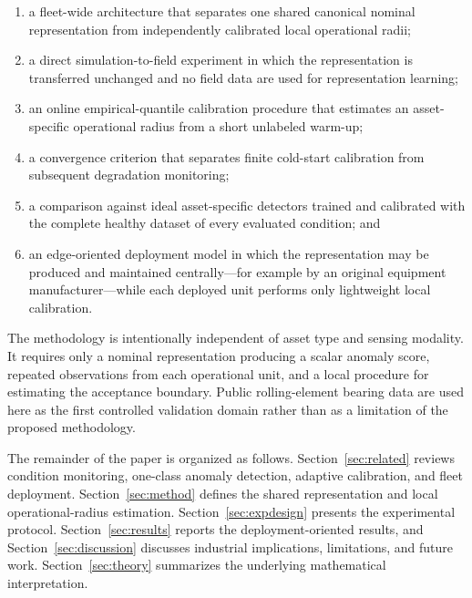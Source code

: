 \documentclass[11pt,a4paper]{article}
\begin{document}
\begin{enumerate}[leftmargin=1.5em]
    \item a fleet-wide architecture that separates one shared canonical nominal representation
    from independently calibrated local operational radii;

    \item a direct simulation-to-field experiment in which the representation is transferred
    unchanged and no field data are used for representation learning;

    \item an online empirical-quantile calibration procedure that estimates an asset-specific
    operational radius from a short unlabeled warm-up;

    \item a convergence criterion that separates finite cold-start calibration from subsequent
    degradation monitoring;

    \item a comparison against ideal asset-specific detectors trained and calibrated with the
    complete healthy dataset of every evaluated condition; and

    \item an edge-oriented deployment model in which the representation may be produced and
    maintained centrally---for example by an original equipment manufacturer---while each
    deployed unit performs only lightweight local calibration.
\end{enumerate}

The methodology is intentionally independent of asset type and sensing modality. It requires only
a nominal representation producing a scalar anomaly score, repeated observations from each
operational unit, and a local procedure for estimating the acceptance boundary. Public
rolling-element bearing data are used here as the first controlled validation domain rather than
as a limitation of the proposed methodology.

The remainder of the paper is organized as follows. Section~\ref{sec:related} reviews condition
monitoring, one-class anomaly detection, adaptive calibration, and fleet deployment.
Section~\ref{sec:method} defines the shared representation and local operational-radius
estimation. Section~\ref{sec:expdesign} presents the experimental protocol.
Section~\ref{sec:results} reports the deployment-oriented results, and
Section~\ref{sec:discussion} discusses industrial implications, limitations, and future work.
Section~\ref{sec:theory} summarizes the underlying mathematical interpretation.
\end{document}
